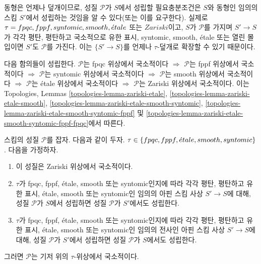 \noindent
동형은 언제나 덮개이므로, 성질 $\mathcal{P}$가 $S$에서 성립할 필요충분조건은
$S$와 동형인 임의의 스킴 $S'$에서 성립하는 것임을 알 수 있다(또는 이를
요구한다). 실제로
$\tau = fpqc, \linebreak[0] fppf, \linebreak[0] syntomic,
\linebreak[0] smooth, \linebreak[0] \etale$ 또는 $Zariski$이고, $S$가
$\mathcal{P}$를 가지며 $S' \to S$가 각각 평탄, 평탄하고 국소적으로 유한
표시, syntomic, smooth, \'etale 또는 열린 몰입이면 $S'$도 $\mathcal{P}$를
가진다. 이는 $\{S' \to S\}$를 언제나 $\tau$-덮개로 확장할 수 있기
때문이다.

\medskip\noindent
다음 함의들이 성립한다.
$\mathcal{P}$는 fpqc 위상에서 국소적이다
$\Rightarrow$
$\mathcal{P}$는 fppf 위상에서 국소적이다
$\Rightarrow$
$\mathcal{P}$는 syntomic 위상에서 국소적이다
$\Rightarrow$
$\mathcal{P}$는 smooth 위상에서 국소적이다
$\Rightarrow$
$\mathcal{P}$는 \'etale 위상에서 국소적이다
$\Rightarrow$
$\mathcal{P}$는 Zariski 위상에서 국소적이다.
이는 Topologies, Lemmas
\ref{topologies-lemma-zariski-etale},
\ref{topologies-lemma-zariski-etale-smooth},
\ref{topologies-lemma-zariski-etale-smooth-syntomic},
\ref{topologies-lemma-zariski-etale-smooth-syntomic-fppf} 및
\ref{topologies-lemma-zariski-etale-smooth-syntomic-fppf-fpqc}에서 따른다.

\begin{lemma}
\label{lemma-descending-properties}
스킴의 성질 $\mathcal{P}$를 잡자. 다음과 같이 두자.
$\tau \in \{fpqc, \linebreak[0] fppf, \linebreak[0]
\etale, \linebreak[0] smooth, \linebreak[0] syntomic\}$.
다음을 가정하자.
\begin{enumerate}
\item 이 성질은 Zariski 위상에서 국소적이다.
\item $\tau$가 fpqc, fppf, \'etale, smooth 또는 syntomic인지에 따라 각각
평탄, 평탄하고 유한 표시, \'etale, smooth 또는 syntomic인 임의의 아핀
스킴 사상 $S' \to S$에 대해, 성질 $\mathcal{P}$가 $S$에서 성립하면
성질 $\mathcal{P}$가 $S'$에서도 성립한다.
\item $\tau$가 fpqc, fppf, \'etale, smooth 또는 syntomic인지에 따라 각각
평탄, 평탄하고 유한 표시, \'etale, smooth 또는 syntomic인 임의의 전사인
아핀 스킴 사상 $S' \to S$에 대해, 성질 $\mathcal{P}$가 $S'$에서 성립하면
성질 $\mathcal{P}$가 $S$에서도 성립한다.
\end{enumerate}
그러면 $\mathcal{P}$는 기저 위의 $\tau$-위상에서 국소적이다.
\end{lemma}

